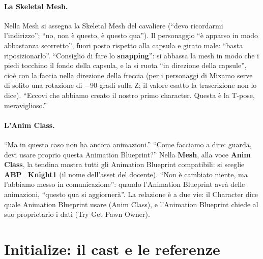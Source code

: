 \paragraph{La Skeletal Mesh.} Nella Mesh si assegna la Skeletal Mesh del cavaliere (``devo
ricordarmi l'indirizzo''; ``no, non è questo, è questo qua''). Il personaggio ``è apparso
in modo abbastanza scorretto'', fuori posto rispetto alla capsula e girato male: ``basta
riposizionarlo''. ``Consiglio di fare lo \textbf{snapping}'': si abbassa la mesh in modo
che i piedi tocchino il fondo della capsula, e la si ruota ``in direzione della capsule'',
cioè con la faccia nella direzione della freccia (per i personaggi di Mixamo
serve di solito una rotazione di $-$90 gradi sulla Z; il valore esatto la trascrizione
non lo dice). ``Eccovi che abbiamo creato il nostro primo character.
Questa è la T-pose, meraviglioso.''

\paragraph{L'Anim Class.} ``Ma in questo caso non ha ancora animazioni.'' ``Come facciamo
a dire: guarda, devi usare proprio questa Animation Blueprint?'' Nella \textbf{Mesh}, alla
voce \textbf{Anim Class}, la tendina mostra tutti gli Animation Blueprint compatibili:
si sceglie \textbf{ABP\_Knight1} (il nome dell'asset del docente). ``Non è cambiato
niente, ma l'abbiamo messo in comunicazione'': quando l'Animation Blueprint avrà delle
animazioni, ``questo qua si aggiornerà''. La relazione è a due vie: il Character dice
quale Animation Blueprint usare (Anim Class), e l'Animation Blueprint chiede al suo
proprietario i dati (Try Get Pawn Owner).

\section{Initialize: il cast e le referenze}
\label{ue8:sec:initialize}

